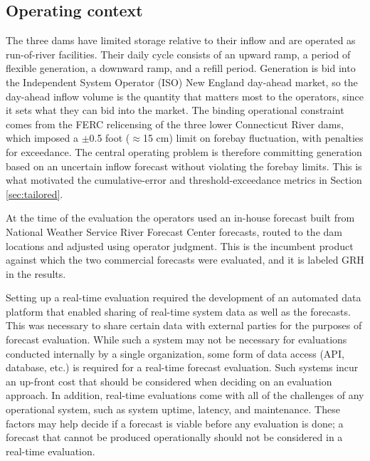 \documentclass[MLA]{USG} %
\begin{document}
\subsection{Operating context}\label{sec:context}

The three dams have limited storage relative to their inflow and are operated as run-of-river facilities. Their daily cycle consists of an upward ramp, a period of flexible generation, a downward ramp, and a refill period. Generation is bid into the Independent System Operator (ISO) New England day-ahead market, so the day-ahead inflow volume is the quantity that matters most to the operators, since it sets what they can bid into the market. The binding operational constraint comes from the FERC relicensing of the three lower Connecticut River dams, which imposed a $\pm$0.5 foot ($\approx$15 cm) limit on forebay fluctuation, with penalties for exceedance. The central operating problem is therefore committing generation based on an uncertain inflow forecast without violating the forebay limits. This is what motivated the cumulative-error and threshold-exceedance metrics in Section \ref{sec:tailored}.

At the time of the evaluation the operators used an in-house forecast built from National Weather Service River Forecast Center forecasts, routed to the dam locations and adjusted using operator judgment. This is the incumbent product against which the two commercial forecasts were evaluated, and it is labeled GRH in the results.

Setting up a real-time evaluation required the development of an automated data platform that enabled sharing of real-time system data as well as the forecasts. This was necessary to share certain data with external parties for the purposes of forecast evaluation. While such a system may not be necessary for evaluations conducted internally by a single organization, some form of data access (API, database, etc.) is required for a real-time forecast evaluation. Such systems incur an up-front cost that should be considered when deciding on an evaluation approach. In addition, real-time evaluations come with all of the challenges of any operational system, such as system uptime, latency, and maintenance. These factors may help decide if a forecast is viable before any evaluation is done; a forecast that cannot be produced operationally should not be considered in a real-time evaluation.
\end{document}
